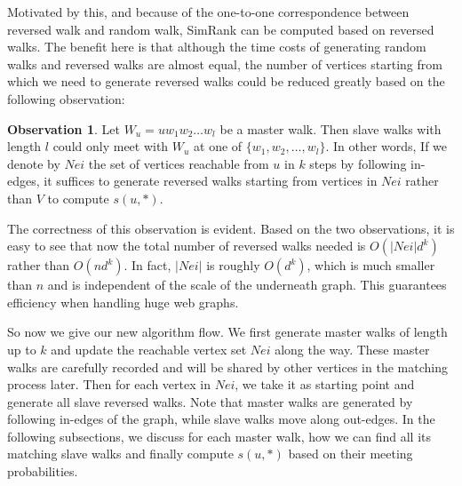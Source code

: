 \documentclass[conference]{IEEEtran}
\theoremstyle{definition}
\theoremstyle{definition}
\newtheorem{observation}{Observation}%
\begin{document}
Motivated by this, and because of the one-to-one correspondence between reversed walk and random walk, SimRank can be computed based on reversed walks. 
The benefit here is that although the time costs of generating random walks and reversed walks are almost equal, 
the number of vertices starting from which we need to generate reversed walks could be reduced greatly
based on the following observation:

\begin{observation}
Let $W_u=uw_1w_2\dots w_l$ be a  master walk.
Then slave walks with length $l$ could only meet with $W_u$ at one of $\{w_1, w_2, \dots, w_l\}$.
In other words, If we denote by $Nei$ the set of vertices reachable from $u$ in $k$ steps by following in-edges, it suffices to generate reversed walks starting from vertices in $Nei$ rather than $V$ to compute $s(u,*)$.
\end{observation}

The  correctness of this observation is evident. 
Based on the two observations, it is easy to see that now the total  number of reversed walks needed  is $O(|Nei|d^k)$ rather than $O(nd^k)$. 
In fact, $|Nei|$ is roughly $O(d^k)$, which is much smaller than $n$ and is independent of the scale of the underneath graph.
This guarantees efficiency when handling huge web graphs. 

So now we give our new algorithm flow. 
We first generate master walks of length up to $k$ and update the reachable vertex set $Nei$ along the way.
These master walks are carefully recorded and will be shared  by other vertices  in the matching process later.
Then for each vertex in $Nei$, we take it as starting point and generate all slave reversed walks. 
Note that master walks are generated by following in-edges of the graph, while slave walks move along out-edges.
In the following subsections, we discuss for each master walk, how we can find all its matching slave walks and finally compute $s(u, *)$ based on their meeting probabilities.
\end{document}
